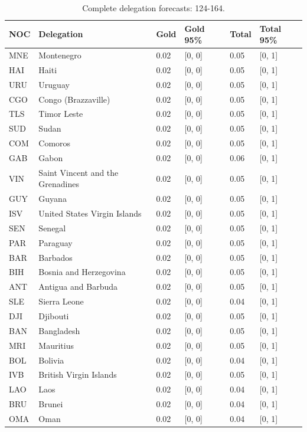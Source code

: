 \documentclass[11pt,a4paper]{article}
\begin{document}
{\small\begin{longtable}{@{}L{1.098cm} L{4.464cm} R{1.463cm} R{2.195cm} R{1.610cm} R{2.342cm}@{}}
\caption{Complete delegation forecasts: 124-164.}\label{tab:11}\\
\toprule
NOC & Delegation & Gold & Gold 95\% & Total & Total 95\%\\
\midrule
\endhead
MNE & Montenegro & 0.02 & [0, 0] & 0.05 & [0, 1]\\
HAI & Haiti & 0.02 & [0, 0] & 0.05 & [0, 1]\\
URU & Uruguay & 0.02 & [0, 0] & 0.05 & [0, 1]\\
CGO & Congo (Brazzaville) & 0.02 & [0, 0] & 0.05 & [0, 1]\\
TLS & Timor Leste & 0.02 & [0, 0] & 0.05 & [0, 1]\\
SUD & Sudan & 0.02 & [0, 0] & 0.05 & [0, 1]\\
COM & Comoros & 0.02 & [0, 0] & 0.05 & [0, 1]\\
GAB & Gabon & 0.02 & [0, 0] & 0.06 & [0, 1]\\
VIN & Saint Vincent and the Grenadines & 0.02 & [0, 0] & 0.05 & [0, 1]\\
GUY & Guyana & 0.02 & [0, 0] & 0.05 & [0, 1]\\
ISV & United States Virgin Islands & 0.02 & [0, 0] & 0.05 & [0, 1]\\
SEN & Senegal & 0.02 & [0, 0] & 0.05 & [0, 1]\\
PAR & Paraguay & 0.02 & [0, 0] & 0.05 & [0, 1]\\
BAR & Barbados & 0.02 & [0, 0] & 0.05 & [0, 1]\\
BIH & Bosnia and Herzegovina & 0.02 & [0, 0] & 0.05 & [0, 1]\\
ANT & Antigua and Barbuda & 0.02 & [0, 0] & 0.05 & [0, 1]\\
SLE & Sierra Leone & 0.02 & [0, 0] & 0.04 & [0, 1]\\
DJI & Djibouti & 0.02 & [0, 0] & 0.05 & [0, 1]\\
BAN & Bangladesh & 0.02 & [0, 0] & 0.05 & [0, 1]\\
MRI & Mauritius & 0.02 & [0, 0] & 0.05 & [0, 1]\\
BOL & Bolivia & 0.02 & [0, 0] & 0.04 & [0, 1]\\
IVB & British Virgin Islands & 0.02 & [0, 0] & 0.05 & [0, 1]\\
LAO & Laos & 0.02 & [0, 0] & 0.04 & [0, 1]\\
BRU & Brunei & 0.02 & [0, 0] & 0.04 & [0, 1]\\
OMA & Oman & 0.02 & [0, 0] & 0.04 & [0, 1]\\

\end{longtable}}
\end{document}
